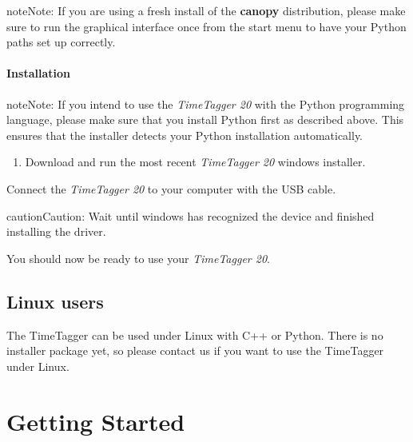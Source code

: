 \documentclass[letterpaper,10pt,english]{sphinxmanual}
\begin{document}
\begin{notice}{note}{Note:}
If you are using a fresh install of the \textbf{canopy} distribution, please make sure to run the graphical interface once from the start menu to have your Python paths set up correctly.
\end{notice}


\subsubsection{Installation}
\label{sections/installation:installation}
\begin{notice}{note}{Note:}
If you intend to use the \emph{TimeTagger 20} with the Python programming language, please make sure that you install Python first as described above. This ensures that the installer detects your Python installation automatically.
\end{notice}
\begin{enumerate}
\item {} 
Download and run the most recent \emph{TimeTagger 20} windows installer.

\end{enumerate}

Connect the \emph{TimeTagger 20} to your computer with the USB cable.

\begin{notice}{caution}{Caution:}
Wait until windows has recognized the device and finished installing the driver.
\end{notice}

You should now be ready to use your \emph{TimeTagger 20}.


\section{Linux users}
\label{sections/installation:linux-users}
The TimeTagger can be used under Linux with C++ or Python. There is no installer package yet, so please contact us if you want to use the TimeTagger under Linux.


\chapter{Getting Started}
\label{sections/gettingStarted:quickstart}\label{sections/gettingStarted:getting-started}\label{sections/gettingStarted::doc}
\end{document}
